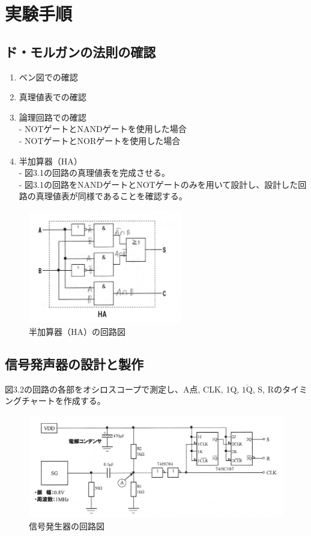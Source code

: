 \documentclass{jlreq}
\numberwithin{equation}{section}
\begin{document}
\section{実験手順}
\subsection{ド・モルガンの法則の確認}
\begin{enumerate}
  \item ベン図での確認
  \item 真理値表での確認
  \item 論理回路での確認 \\
  - NOTゲートとNANDゲートを使用した場合 \\
  - NOTゲートとNORゲートを使用した場合
  \item 半加算器（HA） \\
  - 図3.1の回路の真理値表を完成させる。 \\
  - 図3.1の回路をNANDゲートとNOTゲートのみを用いて設計し、設計した回路の真理値表が同様であることを確認する。
\end{enumerate}

\begin{figure}[H]
  \centering
  \includegraphics[width=0.6\textwidth]{assets/HAkairo.png}
  \caption{半加算器（HA）の回路図}
\end{figure}

\subsection{信号発声器の設計と製作}
図3.2の回路の各部をオシロスコープで測定し、A点, CLK, 1Q, \(\overline{\text{1Q}}\), S, Rのタイミングチャートを作成する。

\begin{figure}[H]
  \centering
  \includegraphics[width=\textwidth]{assets/SGkairo.png}
  \caption{信号発生器の回路図}
\end{figure}
\end{document}
